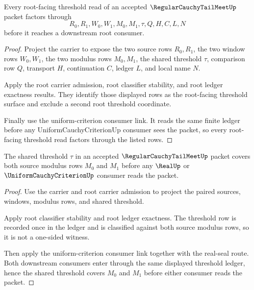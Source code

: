 \begin{theorem}
\label{thm:regular-cauchy-tail-meet-root-threshold-source-ledger}
Every root-facing threshold read of an accepted $\RegularCauchyTailMeetUp$ packet factors through
$$
R_0,R_1,W_0,W_1,M_0,M_1,\tau,Q,H,C,L,N
$$
before it reaches a downstream root consumer.
\end{theorem}
\begin{proof}
Project the carrier to expose the two source rows $R_0,R_1$, the two window rows $W_0,W_1$, the two modulus rows $M_0,M_1$, the shared threshold $\tau$, comparison row $Q$, transport $H$, continuation $C$, ledger $L$, and local name $N$.

Apply the root carrier admission, root classifier stability, and root ledger exactness results. They identify those displayed rows as the root-facing threshold surface and exclude a second root threshold coordinate.

Finally use the uniform-criterion consumer link. It reads the same finite ledger before any UniformCauchyCriterionUp consumer sees the packet, so every root-facing threshold read factors through the listed rows.
\end{proof}

\begin{theorem}
\label{thm:regular-cauchy-tail-meet-root-shared-threshold-coverage}
The shared threshold $\tau$ in an accepted $\RegularCauchyTailMeetUp$ packet covers both source modulus rows $M_0$ and $M_1$ before any $\RealUp$ or $\UniformCauchyCriterionUp$ consumer reads the packet.
\end{theorem}
\begin{proof}
Use the carrier and root carrier admission to project the paired sources, windows, modulus rows, and shared threshold.

Apply root classifier stability and root ledger exactness. The threshold row is recorded once in the ledger and is classified against both source modulus rows, so it is not a one-sided witness.

Then apply the uniform-criterion consumer link together with the real-seal route. Both downstream consumers enter through the same displayed threshold ledger, hence the shared threshold covers $M_0$ and $M_1$ before either consumer reads the packet.
\end{proof}

